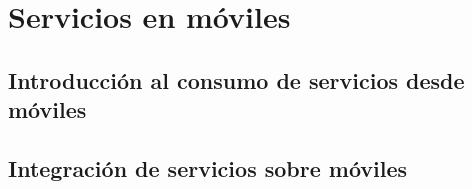\chapter{Servicios en móviles}
\section{Introducción al consumo de servicios desde móviles}

\section{Integración de servicios sobre móviles}
